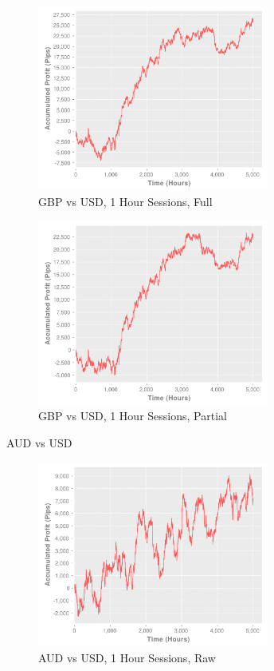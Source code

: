 \documentclass[letterpaper]{article}
\begin{document}
\begin{figure}[!t]
  \centering
  \includegraphics[width=3.0in]{gbpusd60-of}
  \caption{GBP vs USD, 1 Hour Sessions, Full}
  \label{gbpusd60-of}
\end{figure}

\begin{figure}[!t]
  \centering
  \includegraphics[width=3.0in]{gbpusd60-op}
  \caption{GBP vs USD, 1 Hour Sessions, Partial}
  \label{gbpusd60-op}
\end{figure}

AUD vs USD

\begin{figure}[!t]
  \centering
  \includegraphics[width=3.0in]{audusd60-r}
  \caption{AUD vs USD, 1 Hour Sessions, Raw}
  \label{audusd60-r}
\end{figure}
\end{document}
